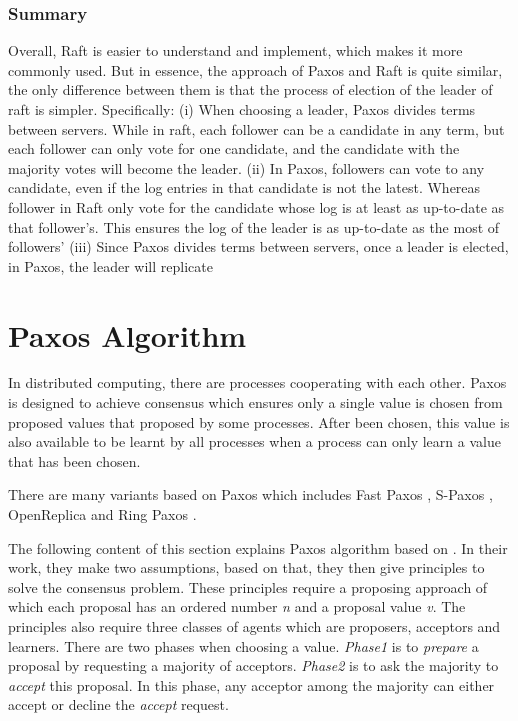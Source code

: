 \documentclass[12pt, a4paper]{article}
\begin{document}
\subsubsection{Summary}
Overall, Raft is easier to understand and implement, which makes it more commonly used. But in essence, the approach of Paxos and Raft is quite similar, the only difference between them is that the process of election of the leader of raft is simpler. Specifically: (i) When choosing a leader, Paxos divides terms between servers. While in raft, each follower can be a candidate in any term, but each follower can only vote for one candidate, and the candidate with the majority votes will become the leader. (ii) In Paxos, followers can vote to any candidate, even if the log entries in that candidate is not the latest. Whereas follower in Raft only vote for the candidate whose log is at least as up-to-date as that follower's. This ensures the log of the leader
is as up-to-date as the most of followers' (iii) Since Paxos divides terms between servers, once a leader is elected, in Paxos, the leader will replicate

\section{Paxos Algorithm} \label{sec:paxos}

In distributed computing, there are processes cooperating with each other.
Paxos is designed to achieve consensus which ensures
only a single value is chosen from proposed values that
proposed by some processes\cite{fischer1983consensus}.
After been chosen, this value is also available to be learnt by all processes
when a process can only learn a value that has been chosen.

There are many variants based on Paxos \cite{lamport2001paxos} which includes
Fast Paxos \cite{fastpaxos}, S-Paxos \cite{spaxos},  OpenReplica \cite{openreplica}
and Ring Paxos \cite{ringpaxos}.

The following content of this section explains
Paxos algorithm based on \cite{fischer1983consensus}.
In their work, they make two assumptions,
based on that, they then give principles to solve the consensus problem.
These principles require a proposing approach
of which each proposal has an ordered number \textit{n}
and a proposal value \textit{v}.
The principles also require three classes of agents
which are proposers, acceptors and learners.
There are two phases when choosing a value.
\textit{Phase1} is to \textit{prepare} a proposal
by requesting a majority of acceptors.
\textit{Phase2} is to ask the majority to \textit{accept} this proposal.
In this phase, any acceptor among the majority can
either accept or decline the \textit{accept} request.
\end{document}
